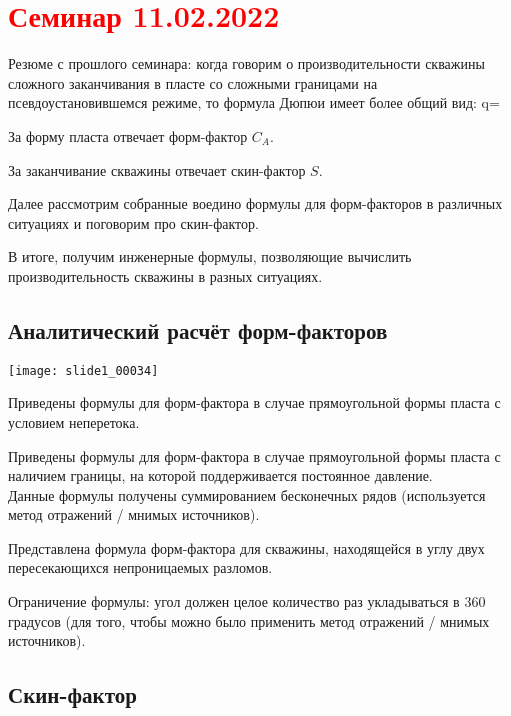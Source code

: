 \documentclass[main.tex]{subfiles}
\begin{document}
\section{\textcolor{red}{Семинар 11.02.2022}}

Резюме с прошлого семинара: когда говорим о производительности скважины сложного заканчивания в пласте со сложными границами на псевдоустановившемся режиме, то формула Дюпюи имеет более общий вид:
\beq
q=
\eeq

За форму пласта отвечает форм-фактор $C_A$.

За заканчивание скважины отвечает скин-фактор $S$.

Далее рассмотрим собранные воедино формулы для форм-факторов в различных ситуациях и поговорим про скин-фактор.

В итоге, получим инженерные формулы, позволяющие вычислить производительность скважины в разных ситуациях.

\subsection{Аналитический расчёт форм-факторов}

\texttt{[image: slide1\_00034]}


Приведены формулы для форм-фактора в случае прямоугольной формы пласта с условием неперетока.


Приведены формулы для форм-фактора в случае прямоугольной формы пласта с наличием границы, на которой поддерживается постоянное давление.\\

Данные формулы получены суммированием бесконечных рядов (используется метод отражений / мнимых источников).


Представлена формула форм-фактора для скважины, находящейся в углу двух пересекающихся непроницаемых разломов.

Ограничение формулы: угол должен целое количество раз укладываться в 360 градусов (для того, чтобы можно было применить метод отражений / мнимых источников).

\subsection{Скин-фактор}
\end{document}

